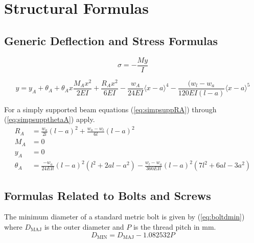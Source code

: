 \section{Structural Formulas}

\subsection{Generic Deflection and Stress Formulas}

\begin{equation}
\sigma = -\frac{My}{I}
\label{eq:bendingstress}
\end{equation}

\begin{equation}
y = y_A + \theta_A + \theta_Ax \frac{M_A x^2}{2EI} + \frac{R_Ax^2}{6EI} - \frac{w_A}{24EI} \langle x-a \rangle^4 - \frac{(w_l-w_a}{120EI(l-a)}\langle x - a \rangle^5
\label{eq:beamdefgeneric}
\end{equation}

For a simply supported beam equations (\ref{eq:simpsuppRA}) through (\ref{eq:simpsuppthetaA}) apply.
\begin{align}
R_A & = \frac{w_a}{2l} (l-a)^2 + \frac{w_a-w_l}{6l}(l - a)^2 \label{eq:simpsuppRA} \\ 
M_A & = 0 \label{eq:simpsuppMA} \\ 
y_A & = 0 \label{eq:simpsuppyA} \\ 
\theta_A & = \frac{-w_a}{24EIl} (l-a)^2 (l^2 + 2al - a^2) - \frac{w_l - w_a}{360EIl}(l-a)^2 (7l^2 + 6al - 3a^2) \label{eq:simpsuppthetaA}
\end{align}

\subsection{Formulas Related to Bolts and Screws}

The minimum diameter of a standard metric bolt is given by (\ref{eq:boltdmin}) where $D_{\text{MAJ}}$ is the outer diameter and $P$  is the thread pitch in mm.
\begin{equation}
D_{\text{MIN}} = D_{\text{MAJ}} - 1.082532 P
\label{eq:boltdmin}
\end{equation}

